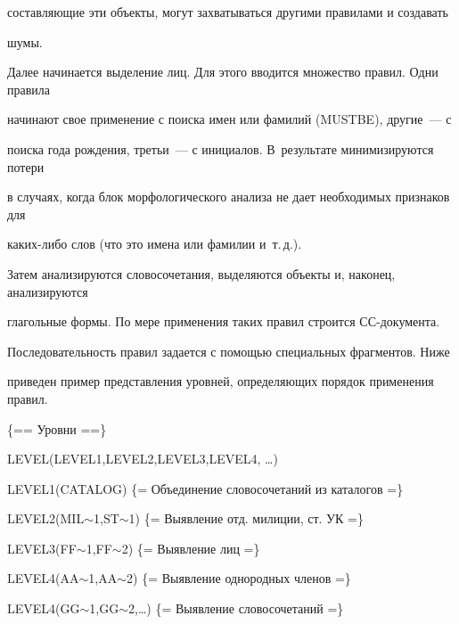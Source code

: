 составляющие эти объекты, могут захватываться другими правилами и создавать 


шумы. 





Далее начинается выделение лиц. Для этого вводится множество правил. Одни правила 


начинают свое применение с поиска имен или фамилий ({\sf MUSTBE}), другие~--- с 


поиска года рождения, третьи~--- с инициалов. В~результате минимизируются потери 


в случаях, когда блок морфологического анализа не дает необходимых признаков для 


каких-либо слов (что это имена или фамилии и~т.\,д.).





Затем анализируются словосочетания, выделяются объекты и, наконец, анализируются 


глагольные формы. По мере применения таких правил строится СС-документа. 


Последовательность правил задается с помощью специальных фрагментов. Ниже 


приведен пример представления уровней, определяющих порядок применения правил.





\{== Уровни ==\}





{\sf LEVEL(LEVEL1,LEVEL2,LEVEL3,LEVEL4, \ldots)





LEVEL1(CATALOG)   \{= Объединение словосочетаний из каталогов =\}





LEVEL2(MIL$\sim$1,ST$\sim$1) \{= Выявление отд. милиции, ст. УК =\}





LEVEL3(FF$\sim$1,FF$\sim$2)    \{= Выявление лиц =\}





  LEVEL4(AA$\sim$1,AA$\sim$2)  \{= Выявление однородных членов =\}





  LEVEL4(GG$\sim$1,GG$\sim$2,\ldots) \{= Выявление словосочетаний =\} }





